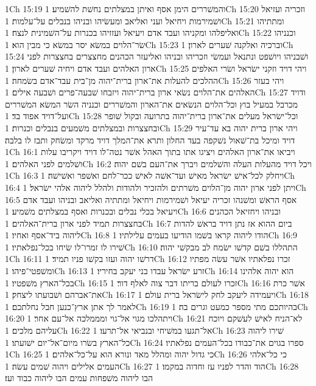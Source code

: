 1Ch 15:19  והמשׁררים הימן אסף ואיתן במצלתים נחשׁת להשׁמיע׃
1Ch 15:20  וזכריה ועזיאל ושׁמירמות ויחיאל ועני ואליאב ומעשׂיהו ובניהו בנבלים על־עלמות׃
1Ch 15:21  ומתתיהו ואליפלהו ומקניהו ועבד אדם ויעיאל ועזזיהו בכנרות על־השׁמינית לנצח׃
1Ch 15:22  וכנניהו שׂר־הלוים במשׂא יסר במשׂא כי מבין הוא׃
1Ch 15:23  וברכיה ואלקנה שׁערים לארון׃
1Ch 15:24  ושׁבניהו ויושׁפט ונתנאל ועמשׂי וזכריהו ובניהו ואליעזר הכהנים מחצצרים בחצצרות לפני ארון האלהים ועבד אדם ויחיה שׁערים לארון׃
1Ch 15:25  ויהי דויד וזקני ישׂראל ושׂרי האלפים ההלכים להעלות את־ארון ברית־יהוה מן־בית עבד־אדם בשׂמחה׃
1Ch 15:26  ויהי בעזר האלהים את־הלוים נשׂאי ארון ברית־יהוה ויזבחו שׁבעה־פרים ושׁבעה אילים׃
1Ch 15:27  ודויד מכרבל במעיל בוץ וכל־הלוים הנשׂאים את־הארון והמשׁררים וכנניה השׂר המשׂא המשׁררים ועל־דויד אפוד בד׃
1Ch 15:28  וכל־ישׂראל מעלים את־ארון ברית־יהוה בתרועה ובקול שׁופר ובחצצרות ובמצלתים משׁמעים בנבלים וכנרות׃
1Ch 15:29  ויהי ארון ברית יהוה בא עד־עיר דויד ומיכל בת־שׁאול נשׁקפה בעד החלון ותרא את־המלך דויד מרקד ומשׂחק ותבז לו בלבה׃
1Ch 16:1  ויביאו את־ארון האלהים ויציגו אתו בתוך האהל אשׁר נטה־לו דויד ויקריבו עלות ושׁלמים לפני האלהים׃
1Ch 16:2  ויכל דויד מהעלות העלה והשׁלמים ויברך את־העם בשׁם יהוה׃
1Ch 16:3  ויחלק לכל־אישׁ ישׂראל מאישׁ ועד־אשׁה לאישׁ ככר־לחם ואשׁפר ואשׁישׁה׃
1Ch 16:4  ויתן לפני ארון יהוה מן־הלוים משׁרתים ולהזכיר ולהודות ולהלל ליהוה אלהי ישׂראל׃
1Ch 16:5  אסף הראשׁ ומשׁנהו זכריה יעיאל ושׁמירמות ויחיאל ומתתיה ואליאב ובניהו ועבד אדם ויעיאל בכלי נבלים ובכנרות ואסף במצלתים משׁמיע׃
1Ch 16:6  ובניהו ויחזיאל הכהנים בחצצרות תמיד לפני ארון ברית־האלהים׃
1Ch 16:7  ביום ההוא אז נתן דויד בראשׁ להדות ליהוה ביד־אסף ואחיו׃
1Ch 16:8  הודו ליהוה קראו בשׁמו הודיעו בעמים עלילתיו׃
1Ch 16:9  שׁירו לו זמרו־לו שׂיחו בכל־נפלאתיו׃
1Ch 16:10  התהללו בשׁם קדשׁו ישׂמח לב מבקשׁי יהוה׃
1Ch 16:11  דרשׁו יהוה ועזו בקשׁו פניו תמיד׃
1Ch 16:12  זכרו נפלאתיו אשׁר עשׂה מפתיו ומשׁפטי־פיהו׃
1Ch 16:13  זרע ישׂראל עבדו בני יעקב בחיריו׃
1Ch 16:14  הוא יהוה אלהינו בכל־הארץ משׁפטיו׃
1Ch 16:15  זכרו לעולם בריתו דבר צוה לאלף דור׃
1Ch 16:16  אשׁר כרת את־אברהם ושׁבועתו ליצחק׃
1Ch 16:17  ויעמידה ליעקב לחק לישׂראל ברית עולם׃
1Ch 16:18  לאמר לך אתן ארץ־כנען חבל נחלתכם׃
1Ch 16:19  בהיותכם מתי מספר כמעט וגרים בה׃
1Ch 16:20  ויתהלכו מגוי אל־גוי ומממלכה אל־עם אחר׃
1Ch 16:21  לא־הניח לאישׁ לעשׁקם ויוכח עליהם מלכים׃
1Ch 16:22  אל־תגעו במשׁיחי ובנביאי אל־תרעו׃
1Ch 16:23  שׁירו ליהוה כל־הארץ בשׂרו מיום־אל־יום ישׁועתו׃
1Ch 16:24  ספרו בגוים את־כבודו בכל־העמים נפלאתיו׃
1Ch 16:25  כי גדול יהוה ומהלל מאד ונורא הוא על־כל־אלהים׃
1Ch 16:26  כי כל־אלהי העמים אלילים ויהוה שׁמים עשׂה׃
1Ch 16:27  הוד והדר לפניו עז וחדוה במקמו׃
1Ch 16:28  הבו ליהוה משׁפחות עמים הבו ליהוה כבוד ועז׃
